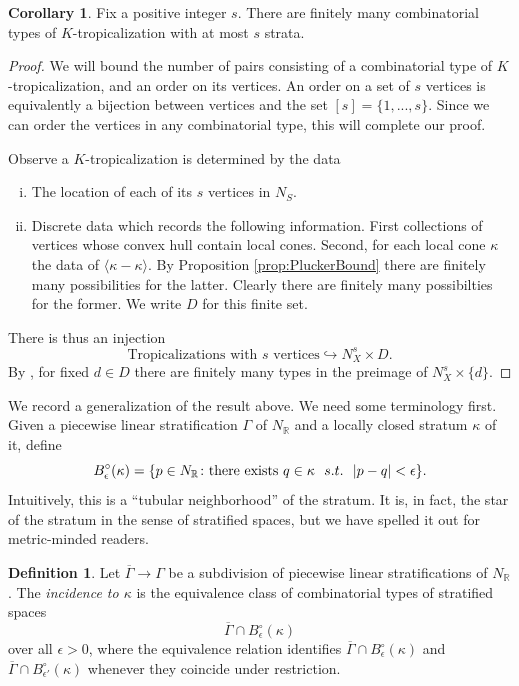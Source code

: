 \documentclass[11pt]{amsart}
\theoremstyle{definition}
\theoremstyle{definition}
\newtheorem{corollary}[theorem]{Corollary}
\newtheorem{definition}[theorem]{Definition}
\begin{document}
\begin{corollary}\label{corr:JustBddNoStrata}
    Fix a positive integer $s$. There are finitely many combinatorial types of $K$-tropicalization with at most $s$ strata.
\end{corollary}

\begin{proof}
    We will bound the number of pairs consisting of a combinatorial type of $K$-tropicalization, and an order on its vertices. An order on a set of $s$ vertices is equivalently a bijection between vertices and the set $[s] = \{1,...,s\}$. Since we can order the vertices in any combinatorial type, this will complete our proof.

    Observe a $K$-tropicalization is determined by the data
    \begin{enumerate}[(i)]
        \item The location of each of its $s$ vertices in $N_S$.
        \item Discrete data which records the following information. First collections of vertices whose convex hull contain local cones. Second, for each local cone $\kappa$ the data of $\langle \kappa - \kappa \rangle $. By Proposition \ref{prop:PluckerBound} there are finitely many possibilities for the latter. Clearly there are finitely many possibilties for the former. We write $D$ for this finite set.
    \end{enumerate}
    There is thus an injection $$\text{Tropicalizations with $s$ vertices}\hookrightarrow N_X^s\times D.$$
    By \cite[Section 2.2.3]{Logquot}, for fixed $d\in D$ there are finitely many types in the preimage of $N_X^s\times \{d\}$.
\end{proof}

We record a generalization of the result above. We need some terminology first. Given a piecewise linear stratification $\Gamma$ of $N_{\mathbb R}$ and a locally closed stratum $\kappa$ of it, define 
\[
B_\epsilon^\circ(\kappa) = \{p\in N_{\mathbb R}\colon \textnormal{there exists } q\in\kappa \ \ s.t. \ \ |p-q|<\epsilon\}. 
\]
Intuitively, this is a ``tubular neighborhood'' of the stratum. It is, in fact, the star of the stratum in the sense of stratified spaces, but we have spelled it out for metric-minded readers. 

\begin{definition}
Let $\overline \Gamma\to \Gamma$ be a subdivision of piecewise linear stratifications of $N_{\mathbb R}$. The {\it incidence to $\kappa$} is the equivalence class of combinatorial types of stratified spaces
\[
\overline\Gamma\cap B_\epsilon^\circ(\kappa)
\]
over all $\epsilon>0$, where the equivalence relation identifies $\overline\Gamma\cap B_\epsilon^\circ(\kappa)$ and $\overline\Gamma\cap B_{\epsilon'}^\circ(\kappa)$ whenever they coincide under restriction. 
\end{definition}
\end{document}
